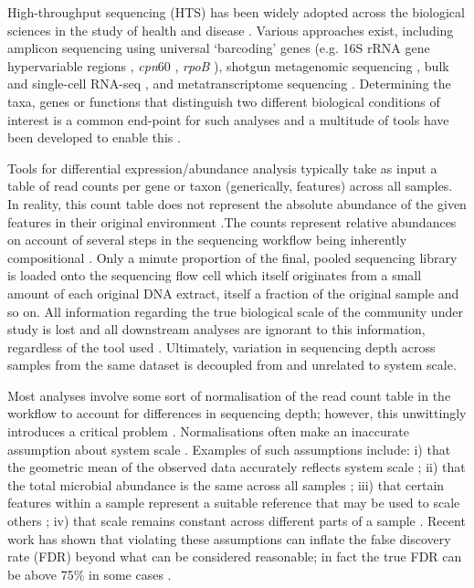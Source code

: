\documentclass[10pt,letterpaper]{article}
\begin{document}
High-throughput sequencing (HTS) has been widely adopted across the biological sciences in the study of health and disease \cite{malla_exploring_2019, Montgomery:2022aa}. Various approaches exist, including amplicon sequencing using universal `barcoding' genes (e.g. 16S rRNA gene hypervariable regions \cite{johnson_evaluation_2019}, \textit{cpn}60 \cite{vancuren_variant_2020}, \textit{rpoB} \cite{ogier_rpob_2019}), shotgun metagenomic sequencing \cite{quince_shotgun_2017}, bulk and single-cell RNA-seq \cite{gate_clonally_2020,jovic_single_2022}, and metatranscriptome sequencing \cite{france_insight_2022}. Determining the taxa, genes or functions that distinguish two different biological conditions of interest is a common end-point for such analyses and a multitude of tools have been developed to enable this \cite{Quinn:2019aa, liu_practical_2021}.

Tools for differential expression/abundance analysis typically take as input a table of read counts per gene or taxon (generically, features) across all samples. In reality, this count table does not represent the absolute abundance of the given features in their original environment \cite{gloor_its_2016,vandeputte_quantitative_2017}.The counts represent relative abundances on account of several steps in the sequencing workflow being inherently compositional \cite{gloor_compositional_2016}. Only a minute proportion of the final, pooled sequencing library is loaded onto the sequencing flow cell which itself originates from a small amount of each original DNA extract, itself a fraction of the original sample and so on. All information regarding the true biological scale of the community under study is lost and all downstream analyses are ignorant to this information, regardless of the tool used \cite{lovell_proportions_2011}. Ultimately, variation in sequencing depth across samples from the same dataset is decoupled from and unrelated to system scale.

Most analyses involve some sort of normalisation of the read count table in the workflow to account for differences in sequencing depth; however, this unwittingly introduces a critical problem \cite{weiss_normalization_2017}. Normalisations often make an inaccurate assumption about system scale \cite{nixon_scale_2024, nixon_incorporating_2025, gloor_explicit_2025}. Examples of such assumptions include: i) that the geometric mean of the observed data accurately reflects system scale \cite{aitchison_statistical_1986}; ii) that the total microbial abundance is the same across all samples \cite{hughes_rarefaction_2005}; iii) that certain features within a sample represent a suitable reference that may be used to scale others \cite{robinson_scaling_2010,vandesompele_accurate_2002}; iv) that scale remains constant across different parts of a sample \cite{anders_2010_differential}. Recent work has shown that violating these assumptions can inflate the false discovery rate (FDR) beyond what can be considered reasonable; in fact the true FDR can be above 75\% in some cases \cite{li_exaggerated_2022,konnaris_uncertainty_2025,nixon_incorporating_2025,gloor_explicit_2025}.
\end{document}
